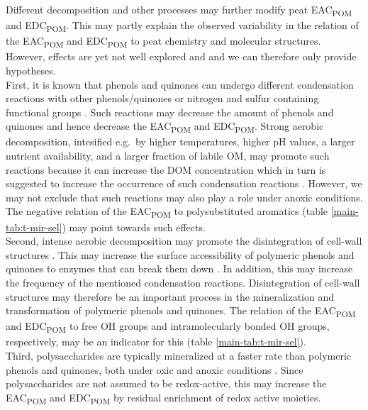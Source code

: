 \documentclass[draft,linenumbers]{agujournal2018}
\begin{document}
Different decomposition and other processes may further modify peat
EAC\textsubscript{POM} and EDC\textsubscript{POM}. This may partly
explain the observed variability in the relation of the
EAC\textsubscript{POM} and EDC\textsubscript{POM} to peat chemistry and
molecular structures. However, effects are yet not well explored and and
we can therefore only provide hypotheses.\\
First, it is known that phenols and quinones can undergo different
condensation reactions with other phenols/quinones
\citep{Hotta.2002, Johnson.2015, Bolton.2018, Zhao.2020} or nitrogen and
sulfur containing functional groups
\citep{Bolton.2018, Olk.2006, Heitmann.2006, Yu.2016}. Such reactions
may decrease the amount of phenols and quinones and hence decrease the
EAC\textsubscript{POM} and EDC\textsubscript{POM}. Strong aerobic
decomposition, intesified e.g.~by higher temperatures, higher pH values,
a larger nutrient availability, and a larger fraction of labile OM, may
promote such reactions because it can increase the DOM concentration
\citep{Bragazza.2007, Fenner.2011, Kang.2018c, Bowring.2020} which in
turn is suggested to increase the occurrence of such condensation
reactions \citep{Hotta.2002, Johnson.2015}. However, we may not exclude
that such reactions may also play a role under anoxic conditions. The
negative relation of the EAC\textsubscript{POM} to polysubstituted
aromatics (table \ref{main-tab:t-mir-sel}) may point towards such
effects.\\
Second, intense aerobic decomposition may promote the disintegration of
cell-wall structures \citep{Tsuneda.2001}. This may increase the surface
accessibility of polymeric phenols and quinones to enzymes that can
break them down \citep{Tsuneda.2001}. In addition, this may increase the
frequency of the mentioned condensation reactions. Disintegration of
cell-wall structures may therefore be an important process in the
mineralization and transformation of polymeric phenols and quinones. The
relation of the EAC\textsubscript{POM} and EDC\textsubscript{POM} to
free OH groups and intramolecularly bonded OH groups, respectively, may
be an indicator for this (table \ref{main-tab:t-mir-sel}).\\
Third, polysaccharides are typically mineralized at a faster rate than
polymeric phenols and quinones, both under oxic and anoxic conditions
\citep{Benner.1984}. Since polysaccharides are not assumed to be
redox-active, this may increase the EAC\textsubscript{POM} and
EDC\textsubscript{POM} by residual enrichment of redox active
moieties.\\
\end{document}
